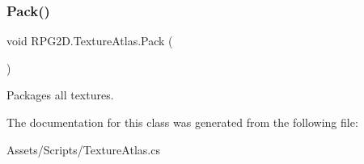 \subsubsection{\texorpdfstring{Pack()}{Pack()}}
{\footnotesize\ttfamily void R\+P\+G2\+D.\+Texture\+Atlas.\+Pack (\begin{DoxyParamCaption}{ }\end{DoxyParamCaption})\hspace{0.3cm}{\ttfamily [inline]}}



Packages all textures. 



The documentation for this class was generated from the following file\+:\begin{DoxyCompactItemize}
\item 
Assets/\+Scripts/Texture\+Atlas.\+cs\end{DoxyCompactItemize}
